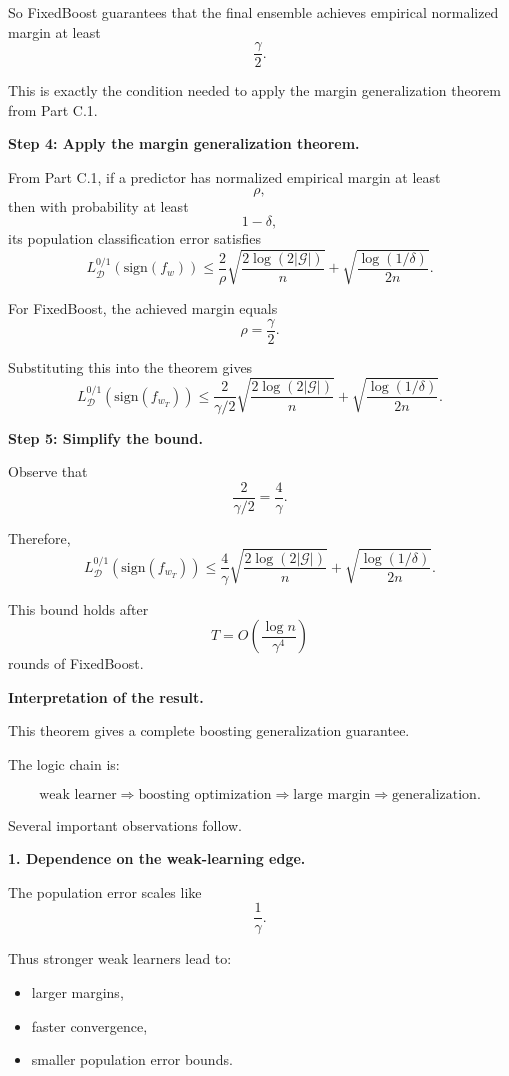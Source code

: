 \documentclass[11pt]{article}
\newcommand{\sign}{\mathrm{sign}}
\begin{document}
\begin{enumerate}
\begin{solutionbox}
So FixedBoost guarantees that the final ensemble achieves empirical normalized margin at least
\[
\frac\gamma2.
\]

This is exactly the condition needed to apply the margin generalization theorem from Part C.1.

\medskip

\textbf{Step 4: Apply the margin generalization theorem.}

From Part C.1, if a predictor has normalized empirical margin at least
\[
\rho,
\]
then with probability at least
\[
1-\delta,
\]
its population classification error satisfies
\[
L_{\mathcal D}^{0/1}(\sign(f_w))
\le
\frac{2}{\rho}
\sqrt{
\frac{
2\log(2|\mathcal G|)
}{n}
}
+
\sqrt{
\frac{
\log(1/\delta)
}{2n}
}.
\]

For FixedBoost, the achieved margin equals
\[
\rho=\frac\gamma2.
\]

Substituting this into the theorem gives
\[
L_{\mathcal D}^{0/1}(\sign(f_{w_T}))
\le
\frac{2}{\gamma/2}
\sqrt{
\frac{
2\log(2|\mathcal G|)
}{n}
}
+
\sqrt{
\frac{
\log(1/\delta)
}{2n}
}.
\]

\medskip

\textbf{Step 5: Simplify the bound.}

Observe that
\[
\frac{2}{\gamma/2}
=
\frac{4}{\gamma}.
\]

Therefore,
\[
\boxed{
L_{\mathcal D}^{0/1}(\sign(f_{w_T}))
\le
\frac{4}{\gamma}
\sqrt{
\frac{
2\log(2|\mathcal G|)
}{n}
}
+
\sqrt{
\frac{
\log(1/\delta)
}{2n}
}.
}
\]

This bound holds after
\[
\boxed{
T
=
O\left(
\frac{\log n}{\gamma^4}
\right)
}
\]
rounds of FixedBoost.

\medskip

\textbf{Interpretation of the result.}

This theorem gives a complete boosting generalization guarantee.

The logic chain is:

\[
\text{weak learner}
\Longrightarrow
\text{boosting optimization}
\Longrightarrow
\text{large margin}
\Longrightarrow
\text{generalization}.
\]

Several important observations follow.

\medskip

\textbf{1. Dependence on the weak-learning edge.}

The population error scales like
\[
\frac1\gamma.
\]

Thus stronger weak learners lead to:
\begin{itemize}
    \item larger margins,
    \item faster convergence,
    \item smaller population error bounds.
\end{itemize}


\end{solutionbox}
\end{enumerate}
\end{document}
